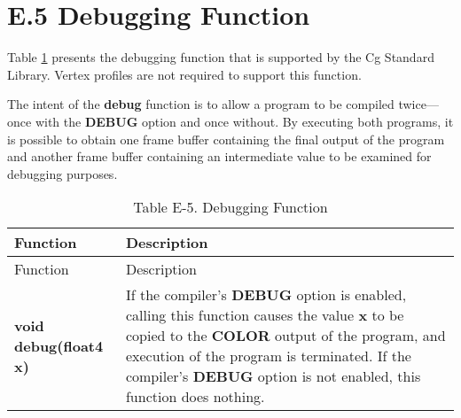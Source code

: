 \documentclass[../main.tex]{subfiles}
\begin{document}
\section{E.5 Debugging Function}

Table \ref{table:E-5} presents the debugging function that is supported by the Cg Standard Library. Vertex profiles are not required to support this function.

The intent of the \textbf{debug} function is to allow a program to be compiled twice—once with the \textbf{DEBUG} option and once without. By executing both programs, it is possible to obtain one frame buffer containing the final output of the program and another frame buffer containing an intermediate value to be examined for debugging purposes.

\FloatBarrier
\begin{longtable}{ p{4cm} p{8cm}  }
\caption{Table E-5. Debugging Function\label{table:E-5}} \\

Function & Description \\
\hline
\endfirsthead
Function & Description \\
\hline
\endhead
\endfoot
\endlastfoot

\textbf{void debug(float4 x)} & If the compiler's \textbf{DEBUG} option is enabled, calling this function causes the value \textbf{x} to be copied to the \textbf{COLOR} output of the program, and execution of the program is terminated. \newline If the compiler's \textbf{DEBUG} option is not enabled, this function does nothing. \\
\hline


\end{longtable}
\FloatBarrier
\end{document}
